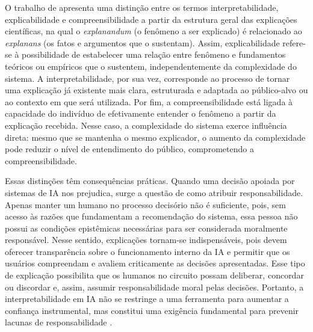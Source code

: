 O trabalho de \cite{Erasmus2021} apresenta uma distinção entre os termos interpretabilidade, explicabilidade e compreensibilidade a partir da estrutura geral das explicações científicas, na qual o \textit{explanandum} (o fenômeno a ser explicado) é relacionado ao \textit{explanans} (os fatos e argumentos que o sustentam). Assim, explicabilidade refere-se à possibilidade de estabelecer uma relação entre fenômeno e fundamentos teóricos ou empíricos que o sustentem, independentemente da complexidade do sistema. A interpretabilidade, por sua vez, corresponde ao processo de tornar uma explicação já existente mais clara, estruturada e adaptada ao público-alvo ou ao contexto em que será utilizada. Por fim, a compreensibilidade está ligada à capacidade do indivíduo de efetivamente entender o fenômeno a partir da explicação recebida. Nesse caso, a complexidade do sistema exerce influência direta: mesmo que se mantenha o mesmo explicador, o aumento da complexidade pode reduzir o nível de entendimento do público, comprometendo a compreensibilidade.

Essas distinções têm consequências práticas. Quando uma decisão apoiada por sistemas de IA nos prejudica, surge a questão de como atribuir responsabilidade. Apenas manter um humano no processo decisório não é suficiente, pois, sem acesso às razões que fundamentam a recomendação do sistema, essa pessoa não possui as condições epistêmicas necessárias para ser considerada moralmente responsável. Nesse sentido, explicações tornam-se indispensáveis, pois devem oferecer transparência sobre o funcionamento interno da IA e permitir que os usuários compreendam e avaliem criticamente as decisões apresentadas. Esse tipo de explicação possibilita que os humanos no circuito possam deliberar, concordar ou discordar e, assim, assumir responsabilidade moral pelas decisões. Portanto, a interpretabilidade em IA não se restringe a uma ferramenta para aumentar a confiança instrumental, mas constitui uma exigência fundamental para prevenir lacunas de responsabilidade \citep{Baum2022}.

